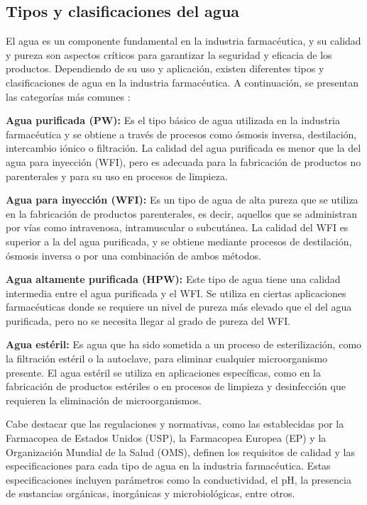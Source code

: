\subsection{Tipos y clasificaciones del agua}

El agua es un componente fundamental en la industria farmacéutica, y su calidad y
pureza son aspectos críticos para garantizar la seguridad y eficacia de los productos.
Dependiendo de su uso y aplicación, existen diferentes tipos y clasificaciones de agua en la industria farmacéutica.
A continuación, se presentan las categorías más comunes \cite{setaphtTratamientosAguaPara}:

\textbf{Agua purificada (PW):} Es el tipo básico de agua utilizada en la industria farmacéutica y se obtiene a través de procesos como ósmosis inversa, destilación, intercambio iónico o filtración. La calidad del agua purificada es menor que la del agua para inyección (WFI), pero es adecuada para la fabricación de productos no parenterales y para su uso en procesos de limpieza.

\textbf{Agua para inyección (WFI):} Es un tipo de agua de alta pureza que se utiliza en la fabricación de productos parenterales, es decir, aquellos que se administran por vías como intravenosa, intramuscular o subcutánea. La calidad del WFI es superior a la del agua purificada, y se obtiene mediante procesos de destilación, ósmosis inversa o por una combinación de ambos métodos.

\textbf{Agua altamente purificada (HPW):} Este tipo de agua tiene una calidad intermedia entre el agua purificada y el WFI. Se utiliza en ciertas aplicaciones farmacéuticas donde se requiere un nivel de pureza más elevado que el del agua purificada, pero no se necesita llegar al grado de pureza del WFI.

\textbf{Agua estéril:} Es agua que ha sido sometida a un proceso de esterilización, como la filtración estéril o la autoclave, para eliminar cualquier microorganismo presente. El agua estéril se utiliza en aplicaciones específicas, como en la fabricación de productos estériles o en procesos de limpieza y desinfección que requieren la eliminación de microorganismos.

Cabe destacar que las regulaciones y normativas, como las establecidas por la Farmacopea de Estados Unidos (USP), la Farmacopea Europea (EP) y la Organización Mundial de la Salud (OMS), definen los requisitos de calidad y las especificaciones para cada tipo de agua en la industria farmacéutica. Estas especificaciones incluyen parámetros como la conductividad, el pH, la presencia de sustancias orgánicas, inorgánicas y microbiológicas, entre otros.
